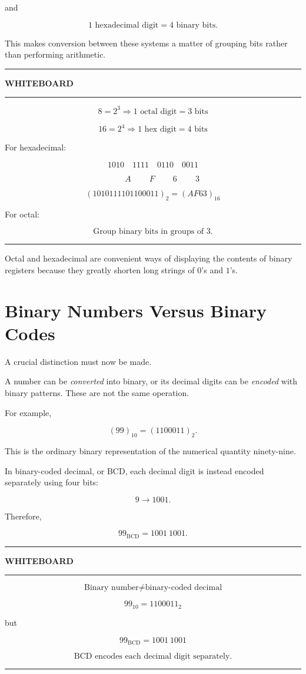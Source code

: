 \documentclass[11pt]{article}
\newenvironment{whiteboard}
{
    \par\medskip
    \begin{center}
    \begin{minipage}{0.94\textwidth}
    \hrule
    \vspace{0.4em}
    \textbf{\large WHITEBOARD}
    \vspace{0.3em}
    \hrule
    \vspace{0.7em}
}
{
    \vspace{0.5em}
    \hrule
    \end{minipage}
    \end{center}
    \medskip
}
\begin{document}
and

\[
\boxed{1\text{ hexadecimal digit}=4\text{ binary bits}}.
\]

This makes conversion between these systems a matter of grouping bits rather
than performing arithmetic.

\begin{whiteboard}
\[
8=2^3
\Rightarrow
1\text{ octal digit}=3\text{ bits}
\]

\[
16=2^4
\Rightarrow
1\text{ hex digit}=4\text{ bits}
\]

For hexadecimal:

\[
1010\quad1111\quad0110\quad0011
\]

\[
\phantom{1010}\ A\qquad\ F\qquad\ 6\qquad\ 3
\]

\[
\boxed{(1010111101100011)_2=(AF63)_{16}}
\]

For octal:

\[
\boxed{\text{Group binary bits in groups of 3.}}
\]
\end{whiteboard}

Octal and hexadecimal are convenient ways of displaying the contents of
binary registers because they greatly shorten long strings of \(0\)'s and
\(1\)'s.

\section{Binary Numbers Versus Binary Codes}

A crucial distinction must now be made.

A number can be \emph{converted} into binary, or its decimal digits can be
\emph{encoded} with binary patterns. These are not the same operation.

For example,

\[
(99)_{10}=(1100011)_2.
\]

This is the ordinary binary representation of the numerical quantity ninety-nine.

In binary-coded decimal, or BCD, each decimal digit is instead encoded
separately using four bits:

\[
9\rightarrow1001.
\]

Therefore,

\[
99_{\text{BCD}}=1001\ 1001.
\]

\begin{whiteboard}
\[
\boxed{\text{Binary number}\neq\text{binary-coded decimal}}
\]

\[
99_{10}=1100011_2
\]

but

\[
99_{\text{BCD}}=1001\ 1001
\]

\[
\boxed{\text{BCD encodes each decimal digit separately.}}
\]
\end{whiteboard}
\end{document}
